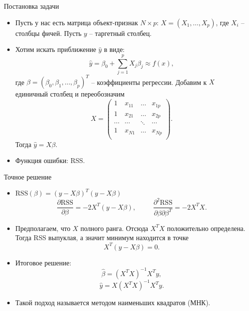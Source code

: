 \documentclass[9pt]{beamer}
\begin{document}
\begin{frame}{Постановка задачи}
\begin{itemize}
    \item Пусть у нас есть матрица объект-признак $N\times p$: $X = (X_1,\ldots,X_p)$, где $X_i$ – столбцы фичей. Пусть $y$ – таргетный столбец.
    \item Хотим искать приближение $\hat y$ в виде:
    $$\hat y =\beta_0 + \sum_{j=1}^p X_j\beta_j \approx f(x),$$
    где $\beta = (\beta_0,\beta_1,\ldots,\beta_p)^T$ – коэффициенты регрессии.
    Добавим к $X$ единичный столбец и переобозначим
    $$X = \begin{pmatrix} 1&x_{11}&\ldots&x_{1p}\\1&x_{21}&\ldots&x_{2p}\\\cdots&\cdots&\ddots&\cdots\\1&x_{N1}&\ldots&x_{Np}\\ \end{pmatrix}.$$
    Тогда $\hat y = X\beta$.
    \item Функция ошибки: RSS.
\end{itemize}
\end{frame}

\begin{frame}{Точное решение}
    \begin{itemize}
        \item $\text{RSS}(\beta) = (y-X\beta)^T(y- X\beta)$
        $$\frac{\partial \text{RSS}}{\partial \beta} = -2X^T(y-X\beta),\;\;\;\;\;\;\;\;\;\frac{\partial^2 \text{RSS}}{\partial \beta\partial\beta^T} = -2X^TX.$$
        \item Предполагаем, что $X$ полного ранга. Отсюда $X^TX$ положительно определена. Тогда RSS выпуклая, а значит минимум находится в точке
        \begin{equation}\label{linreg_projection}
            X^T(y-X\beta) = 0.
        \end{equation}
        \item Итоговое решение:
        \begin{equation}\label{linreg_hat_beta}
            \hat \beta = (X^TX)^{-1}X^Ty,    
        \end{equation}
        \begin{equation}
            \hat y = X(X^TX)^{-1}X^Ty.
        \end{equation}        
        \item Такой подход называется методом наименьших квадратов (МНК).
    \end{itemize}
\end{frame}
\end{document}
